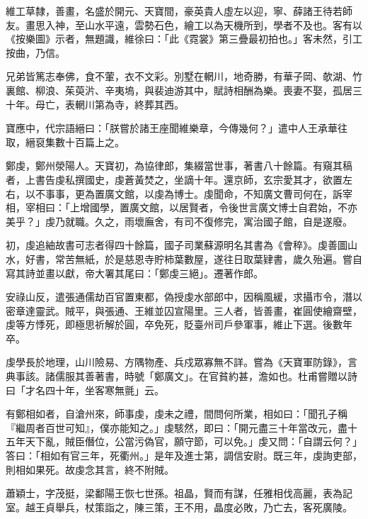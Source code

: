 \begin{pinyinscope}
 維工草隸，善畫，名盛於開元、天寶間，豪英貴人虛左以迎，寧、薛諸王待若師友。畫思入神，至山水平遠，雲勢石色，繪工以為天機所到，學者不及也。客有以《按樂圖》示者，無題識，維徐曰：「此《霓裳》第三疊最初拍也。」客未然，引工按曲，乃信。



 兄弟皆篤志奉佛，食不葷，衣不文彩。別墅在輞川，地奇勝，有華子岡、欹湖、竹裏館、柳浪、茱萸沜、辛夷塢，與裴迪游其中，賦詩相酬為樂。喪妻不娶，孤居三十年。母亡，表輞川第為寺，終葬其西。



 寶應中，代宗語縉曰：「朕嘗於諸王座聞維樂章，今傳幾何？」遣中人王承華往取，縉裒集數十百篇上之。



 鄭虔，鄭州滎陽人。天寶初，為協律郎，集綴當世事，著書八十餘篇。有窺其稿者，上書告虔私撰國史，虔蒼黃焚之，坐謫十年。還京師，玄宗愛其才，欲置左右，以不事事，更為置廣文館，以虔為博士。虔聞命，不知廣文曹司何在，訴宰相，宰相曰：「上增國學，置廣文館，以居賢者，令後世言廣文博士自君始，不亦美乎？」虔乃就職。久之，雨壞廡舍，有司不復修完，寓治國子館，自是遂廢。



 初，虔追紬故書可志者得四十餘篇，國子司業蘇源明名其書為《會稡》。虔善圖山水，好書，常苦無紙，於是慈恩寺貯柿葉數屋，遂往日取葉肄書，歲久殆遍。嘗自寫其詩並畫以獻，帝大署其尾曰：「鄭虔三絕」。遷著作郎。



 安祿山反，遣張通儒劫百官置東都，偽授虔水部郎中，因稱風緩，求攝市令，潛以密章達靈武。賊平，與張通、王維並囚宣陽里。三人者，皆善畫，崔圓使繪齋壁，虔等方悸死，即極思祈解於圓，卒免死，貶臺州司戶參軍事，維止下選。後數年卒。



 虔學長於地理，山川險易、方隅物產、兵戍眾寡無不詳。嘗為《天寶軍防錄》，言典事該。諸儒服其善著書，時號「鄭廣文」。在官貧約甚，澹如也。杜甫嘗贈以詩曰「才名四十年，坐客寒無氈」云。



 有鄭相如者，自滄州來，師事虔，虔未之禮，間問何所業，相如曰：「聞孔子稱『繼周者百世可知』，僕亦能知之。」虔駭然，即曰：「開元盡三十年當改元，盡十五年天下亂，賊臣僭位，公當污偽官，願守節，可以免。」虔又問：「自謂云何？」答曰：「相如有官三年，死衢州。」是年及進士第，調信安尉。既三年，虔詢吏部，則相如果死。故虔念其言，終不附賊。



 蕭穎士，字茂挺，梁鄱陽王恢七世孫。祖晶，賢而有謀，任雅相伐高麗，表為記室。越王貞舉兵，杖策詣之，陳三策，王不用，晶度必敗，乃亡去，客死廣陵。




\end{pinyinscope}
